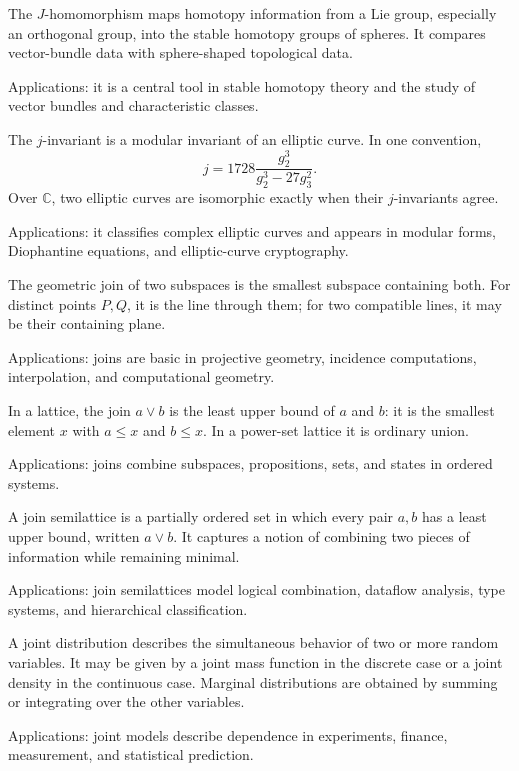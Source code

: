 The $J$-homomorphism maps homotopy information from a Lie group, especially an orthogonal group, into the stable homotopy groups of spheres. It compares vector-bundle data with sphere-shaped topological data. \par\noindent Applications: it is a central tool in stable homotopy theory and the study of vector bundles and characteristic classes.

The $j$-invariant is a modular invariant of an elliptic curve. In one convention,
\[
j=1728\frac{g_2^3}{g_2^3-27g_3^2}.
\]
Over $\mathbb C$, two elliptic curves are isomorphic exactly when their $j$-invariants agree. \par\noindent Applications: it classifies complex elliptic curves and appears in modular forms, Diophantine equations, and elliptic-curve cryptography.

The geometric join of two subspaces is the smallest subspace containing both. For distinct points $P,Q$, it is the line through them; for two compatible lines, it may be their containing plane. \par\noindent Applications: joins are basic in projective geometry, incidence computations, interpolation, and computational geometry.

In a lattice, the join $a\vee b$ is the least upper bound of $a$ and $b$: it is the smallest element $x$ with $a\leq x$ and $b\leq x$. In a power-set lattice it is ordinary union. \par\noindent Applications: joins combine subspaces, propositions, sets, and states in ordered systems.

A join semilattice is a partially ordered set in which every pair $a,b$ has a least upper bound, written $a\vee b$. It captures a notion of combining two pieces of information while remaining minimal. \par\noindent Applications: join semilattices model logical combination, dataflow analysis, type systems, and hierarchical classification.

A joint distribution describes the simultaneous behavior of two or more random variables. It may be given by a joint mass function in the discrete case or a joint density in the continuous case. Marginal distributions are obtained by summing or integrating over the other variables. \par\noindent Applications: joint models describe dependence in experiments, finance, measurement, and statistical prediction.

